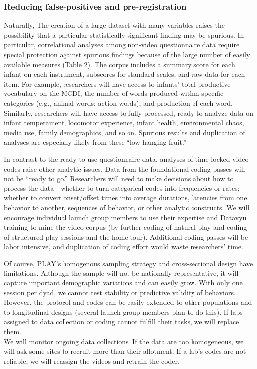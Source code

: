 \documentclass[english,man]{apa6}
\theoremstyle{definition}
\theoremstyle{definition}
\theoremstyle{definition}
\theoremstyle{remark}
\begin{document}
\subsubsection{Reducing false-positives and
pre-registration}\label{reducing-false-positives-and-pre-registration}

Naturally, The creation of a large dataset with many variables raises
the possibility that a particular statistically significant finding may
be spurious. In particular, correlational analyses among non-video
questionnaire data require special protection against spurious findings
because of the large number of easily available measures (Table 2). The
corpus includes a summary score for each infant on each instrument,
subscores for standard scales, and raw data for each item. For example,
researchers will have access to infants' total productive vocabulary on
the MCDI, the number of words produced within specific categories (e.g.,
animal words; action words), and production of each word. Similarly,
researchers will have access to fully processed, ready-to-analyze data
on infant temperament, locomotor experience, infant health,
environmental chaos, media use, family demographics, and so on. Spurious
results and duplication of analyses are especially likely from these
\enquote{low-hanging fruit.}

In contrast to the ready-to-use questionnaire data, analyses of
time-locked video codes raise other analytic issues. Data from the
foundational coding passes will not be \enquote{ready to go.}
Researchers will need to make decisions about how to process the
data---whether to turn categorical codes into frequencies or rates;
whether to convert onset/offset times into average durations, latencies
from one behavior to another, sequences of behavior, or other analytic
constructs. We will encourage individual launch group members to use
their expertise and Datavyu training to mine the video corpus (by
further coding of natural play and coding of structured play sessions
and the home tour). Additional coding passes will be labor intensive,
and duplication of coding effort would waste researchers' time.

Of course, PLAY's homogenous sampling strategy and cross-sectional
design have limitations. Although the sample will not be nationally
representative, it will capture important demographic variations and can
easily grow. With only one session per dyad, we cannot test stability or
predictive validity of behaviors. However, the protocol and codes can be
easily extended to other populations and to longitudinal designs
(several launch group members plan to do this). If labs assigned to data
collection or coding cannot fulfill their tasks, we will replace them.\\
We will monitor ongoing data collections. If the data are too
homogeneous, we will ask some sites to recruit more than their
allotment. If a lab's codes are not reliable, we will reassign the
videos and retrain the coder.
\end{document}
